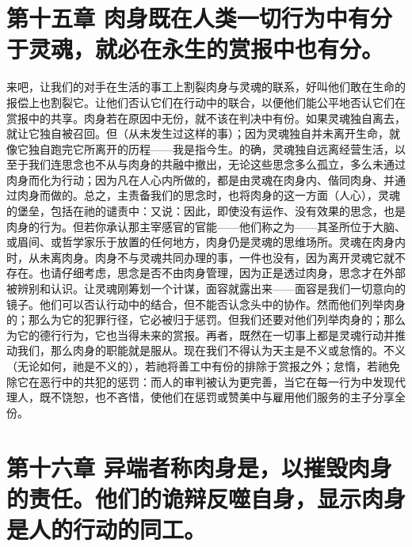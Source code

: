 
\section{第十五章 肉身既在人类一切行为中有分于灵魂，就必在永生的赏报中也有分。}

来吧，让我们的对手在生活的事工上割裂肉身与灵魂的联系，好叫他们敢在生命的报偿上也割裂它。让他们否认它们在行动中的联合，以便他们能公平地否认它们在赏报中的共享。肉身若在原因中无份，就不该在判决中有份。如果灵魂独自离去，就让它独自被召回。但（从未发生过这样的事）；因为灵魂独自并未离开生命，就像它独自跑完它所离开的历程——我是指今生。的确，灵魂独自远离经营生活，以至于我们连思念也不从与肉身的共融中撤出，无论这些思念多么孤立，多么未通过肉身而化为行动；因为凡在人心内所做的，都是由灵魂在肉身内、偕同肉身、并通过肉身而做的。总之，主责备我们的思念时，也将肉身的这一方面（人心），灵魂的堡垒，包括在祂的谴责中：又说：因此，即使没有运作、没有效果的思念，也是肉身的行为。但若你承认那主宰感官的官能——他们称之为——其圣所位于大脑、或眉间、或哲学家乐于放置的任何地方，肉身仍是灵魂的思维场所。灵魂在肉身内时，从未离肉身。肉身不与灵魂共同办理的事，一件也没有，因为离开灵魂它就不存在。也请仔细考虑，思念是否不由肉身管理，因为正是透过肉身，思念才在外部被辨别和认识。让灵魂刚筹划一个计谋，面容就露出来——面容是我们一切意向的镜子。他们可以否认行动中的结合，但不能否认念头中的协作。然而他们列举肉身的；那么为它的犯罪行径，它必被归于惩罚。但我们还要对他们列举肉身的；那么为它的德行行为，它也当得未来的赏报。再者，既然在一切事上都是灵魂行动并推动我们，那么肉身的职能就是服从。现在我们不得认为天主是不义或怠惰的。不义（无论如何，祂是不义的），若祂将善工中有份的排除于赏报之外；怠惰，若祂免除它在恶行中的共犯的惩罚：而人的审判被认为更完善，当它在每一行为中发现代理人，既不饶恕，也不吝惜，使他们在惩罚或赞美中与雇用他们服务的主子分享全份。\par


\section{第十六章 异端者称肉身是，以摧毁肉身的责任。他们的诡辩反噬自身，显示肉身是人的行动的同工。}


